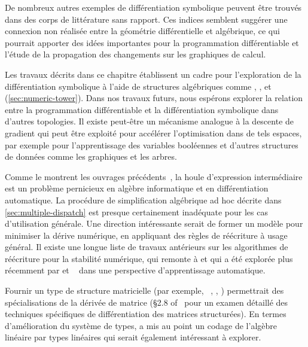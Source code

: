 De nombreux autres exemples de différentiation symbolique peuvent être trouvés dans des corps de littérature sans rapport. Ces indices semblent suggérer une connexion non réalisée entre la géométrie différentielle et algébrique, ce qui pourrait apporter des idées importantes pour la programmation différentiable et l'étude de la propagation des changements sur les graphiques de calcul.

Les travaux décrits dans ce chapitre établissent un cadre pour l'exploration de la différentiation symbolique à l'aide de structures algébriques comme , , et  (\autoref{sec:numeric-tower}). Dans nos travaux futurs, nous espérons explorer la relation entre la programmation différentiable et la différentiation symbolique dans d'autres topologies. Il existe peut-être un mécanisme analogue à la descente de gradient qui peut être exploité pour accélérer l'optimisation dans de tels espaces, par exemple pour l'apprentissage des variables booléennes et d'autres structures de données comme les graphiques et les arbres.

Comme le montrent les ouvrages précédents~\citep{bergstra2010theano, baydin2015survey, laue2019equivalence}, la houle d'expression intermédiaire est un problème pernicieux en algèbre informatique et en différentiation automatique. La procédure de simplification algébrique ad hoc décrite dans \autoref{sec:multiple-dispatch} est presque certainement inadéquate pour les cas d'utilisation générale. Une direction intéressante serait de former un modèle pour minimiser la dérive numérique, en appliquant des règles de réécriture à usage général. Il existe une longue liste de travaux antérieurs sur les algorithmes de réécriture pour la stabilité numérique, qui remonte à \citet{kahan1965summation, dekker1971floating, ogita2005accurate} et qui a été explorée plus récemment par \citet{zaremba2014learning, zaremba2016learning} et ~\citet{wang2019global} dans une perspective d'apprentissage automatique.

Fournir un type de structure matricielle (par exemple, \ , , ) permettrait des spécialisations de la dérivée de matrice (\S 2.8 of~\citet{petersen2012matrix} pour un examen détaillé des techniques spécifiques de différentiation des matrices structurées). En termes d'amélioration du système de types, \citet{makwana2018numlin} a mis au point un codage de l'algèbre linéaire par types linéaires qui serait également intéressant à explorer.


